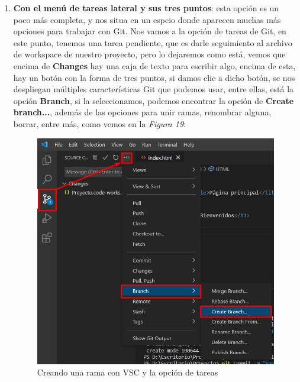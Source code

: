 \begin{enumerate}
    \item \textbf{Con el menú de tareas lateral y sus tres puntos}: esta opción es un poco más completa, y nos situa en un espcio donde aparecen muchas más opciones para trabajar con Git. Nos vamos a la opción de tareas de Git, en este punto, tenemos una tarea pendiente, que es darle seguimiento al archivo de workspace de nuestro proyecto, pero lo dejaremos como está, vemos que encima de \textbf{Changes} hay una caja de texto para escribir algo, encima de esta, hay un botón con la forma de tres puntos, si damos clic a dicho botón, se nos despliegan múltiples características Git que podemos usar, entre ellas, está la opción \textbf{Branch}, si la seleccionamos, podemos encontrar la opción de \textbf{Create branch...}, además de las opciones para unir ramas, renombrar alguna, borrar, entre más, como vemos en la \textit{Figura 19}:
    \begin{figure}[H]
        \begin{center}
            \caption{Creando una rama con VSC y la opción de tareas}
            \label{fig: 19}
            \includegraphics[width=\textwidth]{capturas/creando_b2.png}
        \end{center}
    \end{figure}
\end{enumerate}




